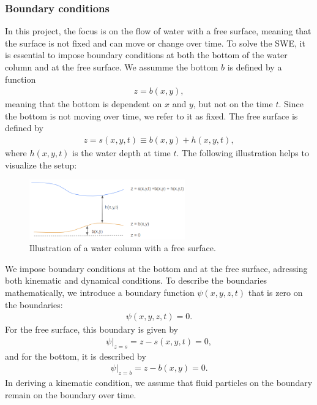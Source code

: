 \subsubsection*{Boundary conditions}
In this project, the focus is on the flow of water with a free surface, meaning that the surface is not fixed and can move or change over time.
To solve the SWE, it is essential to impose boundary conditions at both the bottom of the water column and at the free surface.
We assumme the bottom $b$ is defined by a function
\begin{align*}
    z = b(x,y),
\end{align*}
meaning that the bottom is dependent on $x$ and $y$, but not on the time $t$.
Since the bottom is not moving over time, we refer to it as fixed.
The free surface is defined by 
\begin{align*}
    z = s(x,y,t) \equiv b(x,y) + h(x,y,t),
\end{align*}
where $h(x,y,t)$ is the water depth at time $t$.
The following illustration helps to visualize the setup:
\begin{figure}[H]
    \centering
    \includegraphics[width=0.6\textwidth]{figs/water-column-bc.png}
    \caption{Illustration of a water column with a free surface.}\label{fig:water_column_bc}
\end{figure}
We impose boundary conditions at the bottom and at the free surface, adressing both kinematic and dynamical conditions.
To describe the boundaries mathematically, we introduce a boundary function $\psi(x,y,z,t)$ that is zero on the boundaries:
\begin{align*}
    \psi(x,y,z,t) = 0.
\end{align*}
For the free surface, this boundary is given by
\begin{align}\label{eq:psi_free_surface}
    \psi|_{z = s} = z - s(x,y,t) = 0,
\end{align}
and for the bottom, it is described by
\begin{align}\label{eq:psi_bottom}
    \psi|_{z = b} = z - b(x,y) = 0.
\end{align}
In deriving a kinematic condition, we assume that fluid particles on the boundary remain on the boundary over time.
